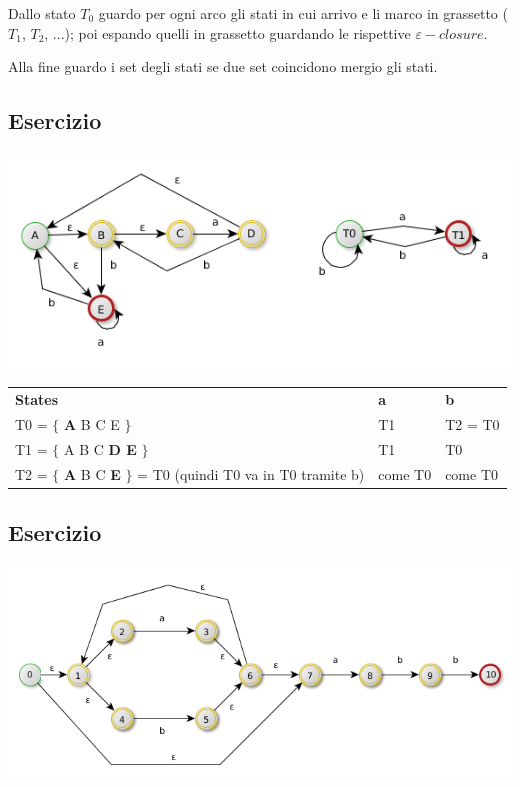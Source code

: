Dallo stato $T_0$ guardo per ogni arco gli stati in cui arrivo e li marco in grassetto ($T_1$, $T_2$, ...); 
poi espando quelli in grassetto guardando le rispettive $\varepsilon - closure$.

Alla fine guardo i set degli stati se due set coincidono mergio gli stati.

\subsection{Esercizio}
\begin{center}
	\includegraphics[scale=0.5]{Chapters/Img/c02_05.png}\\
\end{center} 

\begin{tabular}{lll}
    \textbf{States}                                 &   \textbf{a}        &     \textbf{b} \\
    T0 = $\{$ \textbf{A} B C E $\}$                 &   T1                &     T2  = T0\\
    T1 = $\{$ A B C \textbf{D E} $\}$               &   T1                &     T0 \\
    T2 = $\{$ \textbf{A} B C \textbf{E} $\}$ = T0 (quindi T0 va in T0 tramite b) & come T0 & come T0 \\
\end{tabular}

\subsection{Esercizio}
\begin{center}
	\includegraphics[scale=0.5]{Chapters/Img/c02_03.png}\\
\end{center} 

